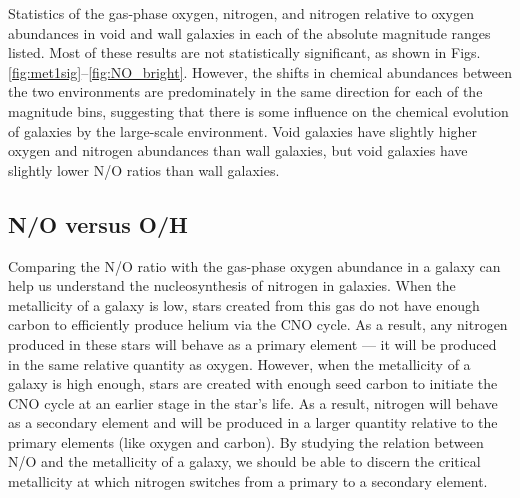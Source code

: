 \begin{table}
    \caption[Abundance statistics]{Statistics of the gas-phase oxygen, nitrogen, 
    and nitrogen relative to oxygen abundances in void and wall galaxies in each 
    of the absolute magnitude ranges listed.  Most of these results are not 
    statistically significant, as shown in Figs. 
    \ref{fig:met1sig}--\ref{fig:NO_bright}.  However, the shifts in chemical 
    abundances between the two environments are predominately in the same 
    direction for each of the magnitude bins, suggesting that there is some 
    influence on the chemical evolution of galaxies by the large-scale 
    environment.   Void galaxies have slightly higher oxygen and nitrogen 
    abundances than wall galaxies, but void galaxies have slightly lower N/O 
    ratios than wall galaxies.}
	    
	\label{tab:stats}
	
\end{table}


\subsection{N/O versus O/H}

Comparing the N/O ratio with the gas-phase oxygen abundance in a galaxy can help 
us understand the nucleosynthesis of nitrogen in galaxies.  When the metallicity 
of a galaxy is low, stars created from this gas do not have enough carbon to 
efficiently produce helium via the CNO cycle.  As a result, any nitrogen 
produced in these stars will behave as a primary element --- it will be produced 
in the same relative quantity as oxygen.  However, when the metallicity of a 
galaxy is high enough, stars are created with enough seed carbon to initiate the 
CNO cycle at an earlier stage in the star's life.  As a result, nitrogen will 
behave as a secondary element and will be produced in a larger quantity relative 
to the primary elements (like oxygen and carbon).  By studying the relation 
between N/O and the metallicity of a galaxy, we should be able to discern the 
critical metallicity at which nitrogen switches from a primary to a secondary 
element.

